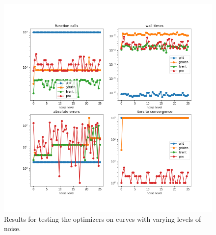\documentclass[letterpaper,12pt,twocolumn]{article}
\begin{document}
\begin{figure}
    \centering
    \includegraphics[width=\textwidth]{../figures/noisy-res.png}
    \caption{Results for testing the optimizers on curves with varying levels of noise.}
    \label{fig:noisy-res}
\end{figure}
\end{document}

